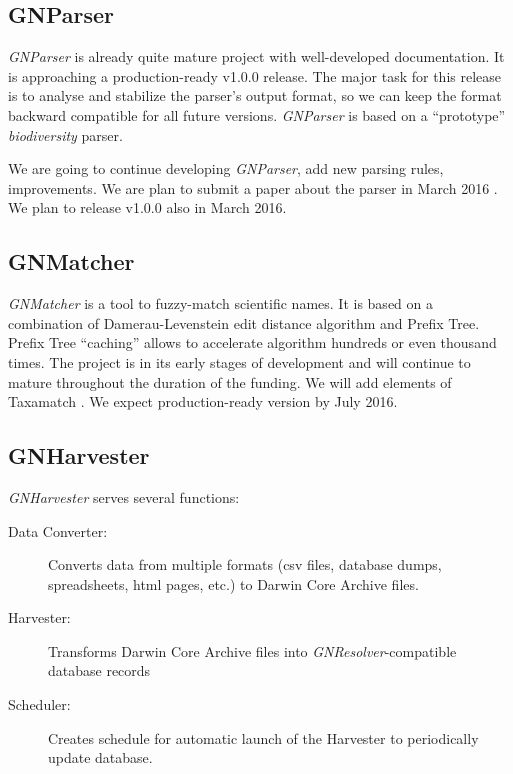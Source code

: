 \documentclass[11pt]{article}
\begin{document}
\subsection{GNParser}

\textit{GNParser} \cite{gnparser} is already quite mature project with
well-developed documentation. It is approaching a production-ready v1.0.0
release.  The major task for this release is to analyse and stabilize the
parser's output format, so we can keep the format backward compatible for all
future versions.  \textit{GNParser} is based on a ``prototype''
\textit{biodiversity} \cite{biodiversity} parser.

We are going to continue developing \textit{GNParser}, add new parsing rules,
improvements. We are plan to submit a paper about the parser in March 2016
\cite{Mozzherin:inpress-a}. We plan to release v1.0.0 also in March 2016.

\subsection{GNMatcher}

\textit{GNMatcher} \cite{gnmatcher} is a tool to fuzzy-match scientific names.
It is based on a combination of Damerau-Levenstein edit distance algorithm and
Prefix Tree.  Prefix Tree ``caching'' allows to accelerate algorithm hundreds
or even thousand times. The project is in its early stages of development and
will continue to mature throughout the duration of the funding. We will add
elements of Taxamatch \cite{Rees2014}. We expect production-ready version by
July 2016.

\subsection{GNHarvester}

\textit{GNHarvester} serves several functions:

\begin{description}

  \item[Data Converter:] Converts data from multiple formats (csv files,
    database dumps, spreadsheets, html pages, etc.) to Darwin Core Archive
    files.

  \item[Harvester:] Transforms Darwin Core Archive files into
    \textit{GNResolver}-compatible database records

  \item[Scheduler:] Creates schedule for automatic launch of the Harvester
    to periodically update database.
\end{description}
\end{document}
